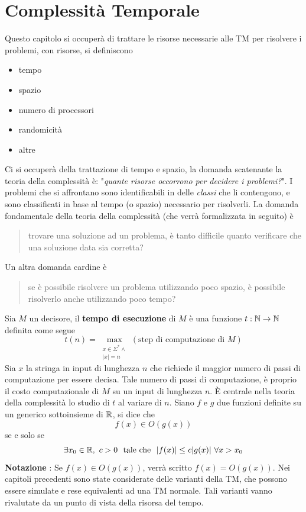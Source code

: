\documentclass[10pt, letterpaper]{report}
\begin{document}
\chapter{Complessità Temporale}
Questo capitolo si occuperà di trattare le risorse necessarie alle TM per risolvere i problemi, con risorse, si definiscono \begin{itemize}
    \item tempo 
    \item spazio 
    \item numero di processori 
    \item randomicità 
    \item altre
\end{itemize}
Ci si occuperà della trattazione di tempo e spazio, la domanda scatenante la teoria della complessità è: "\textit{quante risorse occorrono per decidere i problemi?}".\acc 
I problemi che si affrontano sono identificabili in delle \textit{classi} che li contengono, e sono classificati in base al tempo (o spazio) necessario per risolverli. La domanda fondamentale della teoria della complessità (che verrà formalizzata in seguito) è \begin{quote}
    trovare una soluzione ad un problema, è tanto difficile quanto verificare che una soluzione data sia corretta?
\end{quote}
Un altra domanda cardine è\begin{quote}
    se è possibile risolvere un problema utilizzando poco spazio, è possibile risolverlo anche utilizzando poco tempo?
\end{quote}
  Sia $M$ un decisore, il \textbf{tempo di esecuzione} di $M$ è una funzione $t:{\mathbb N}\rightarrow {\mathbb N}$ definita come segue 
$$ t(n)=\max_{\begin{matrix}x\in\Sigma^* \land \\ |x|=n\end{matrix}}(\text{step di computazione di }M)$$
Sia $x$ la stringa in input di lunghezza $n$ che richiede il maggior numero di passi di computazione per essere decisa. Tale numero di passi di computazione, è proprio il costo computazionale di $M$ su un input di lunghezza $n$. È centrale nella teoria della complessità lo studio di $t$ al variare di $n$.\acc 
{}  Siano $f$ e $g$ due funzioni definite su un generico sottoinsieme di ${\mathbb R}$, si dice che $$ f(x)\in O(g(x))$$ 
se e solo se 
$$ \exists x_0\in \R,\ c>0 \ \text{ tale che } \ |f(x)|\le c|g(x)| \ \forall x>x_0$$
\textbf{Notazione} : Se $f(x)\in O(g(x))$, verrà scritto $f(x)=O(g(x))$.\acc 
Nei capitoli precedenti sono state considerate delle varianti della TM, che possono essere simulate e rese equivalenti ad una TM normale. Tali varianti vanno rivalutate da un punto di vista della risorsa del tempo. 
\end{document}

